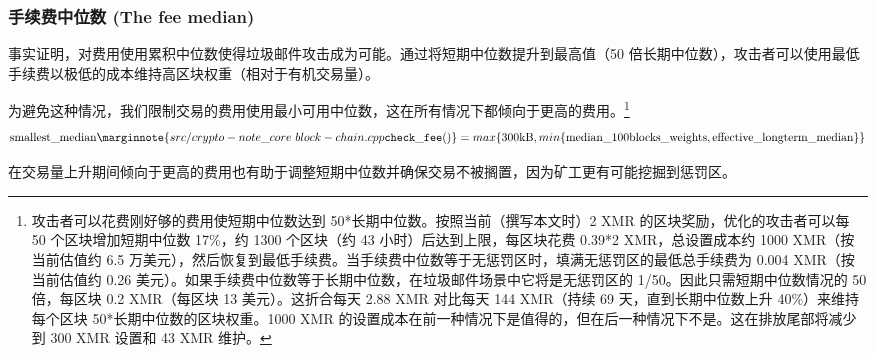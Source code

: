 \subsubsection*{手续费中位数 (The fee median)}

事实证明，对费用使用累积中位数使得垃圾邮件攻击成为可能。通过将短期中位数提升到最高值（50 倍长期中位数），攻击者可以使用最低手续费以极低的成本维持高区块权重（相对于有机交易量）。

为避免这种情况，我们限制交易的费用使用最小可用中位数，这在所有情况下都倾向于更高的费用。\footnote{攻击者可以花费刚好够的费用使短期中位数达到 50*长期中位数。按照当前（撰写本文时）2 XMR 的区块奖励，优化的攻击者可以每 50 个区块增加短期中位数 17\%，约 1300 个区块（约 43 小时）后达到上限，每区块花费 0.39*2 XMR，总设置成本约 1000 XMR（按当前估值约 6.5 万美元），然后恢复到最低手续费。当手续费中位数等于无惩罚区时，填满无惩罚区的最低总手续费为 0.004 XMR（按当前估值约 0.26 美元）。如果手续费中位数等于长期中位数，在垃圾邮件场景中它将是无惩罚区的 1/50。因此只需短期中位数情况的 50 倍，每区块 0.2 XMR（每区块 13 美元）。这折合每天 2.88 XMR 对比每天 144 XMR（持续 69 天，直到长期中位数上升 40\%）来维持每个区块 50*长期中位数的区块权重。1000 XMR 的设置成本在前一种情况下是值得的，但在后一种情况下不是。这在排放尾部将减少到 300 XMR 设置和 43 XMR 维护。}\vspace{.1cm}
\[\textrm{smallest\_median}\marginnote{src/crypto- note\_core\ block- chain.cpp {\tt check\_fee()}} = max\{\textrm{300kB}, min\{\textrm{median\_100blocks\_weights}, \textrm{effective\_longterm\_median}\}\}\]

在交易量上升期间倾向于更高的费用也有助于调整短期中位数并确保交易不被搁置，因为矿工更有可能挖掘到惩罚区。

